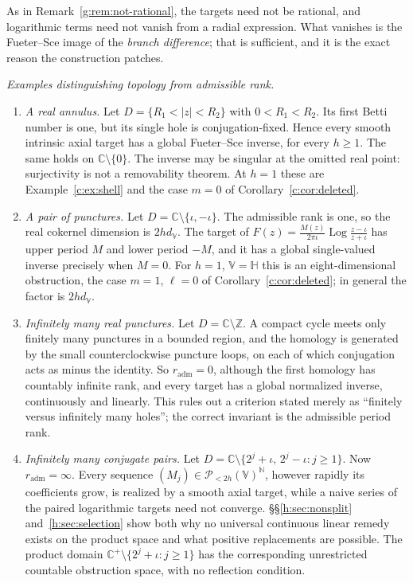 \documentclass[11pt,a4paper]{article}
\numberwithin{equation}{section}
\theoremstyle{definition}
\theoremstyle{remark}
\theoremstyle{plain}
\newcommand{\HH}{\mathbb H}
\newcommand{\CC}{\mathbb C}
\newcommand{\ZZ}{\mathbb Z}
\newcommand{\Cplus}{\CC^{+}}
\newcommand{\abs}[1]{\lvert #1\rvert}
\newcommand{\VV}{\mathbb V}                       %
\newcommand{\dV}{d_{\VV}}                         %
\newcommand{\PolH}{\mathscr P_{<2h}(\VV)}
\begin{document}
As in Remark~\ref{g:rem:not-rational}, the targets need not be rational, and
logarithmic terms need not vanish from a radial expression. What vanishes is
the Fueter--Sce image of the \emph{branch difference}; that is sufficient, and
it is the exact reason the construction patches.

\emph{Examples distinguishing topology from admissible rank.}
\begin{enumerate}[label=\textup{(\alph*)}]
\item \emph{A real annulus.} Let $D=\{R_1<\abs z<R_2\}$ with $0<R_1<R_2$. Its
first Betti number is one, but its single hole is conjugation-fixed. Hence
every smooth intrinsic axial target has a global Fueter--Sce inverse, for every
$h\ge1$. The same holds on $\CC\setminus\{0\}$. The inverse may be singular at
the omitted real point: surjectivity is not a removability theorem. At $h=1$
these are Example~\ref{c:ex:shell} and the case $m=0$ of
Corollary~\ref{c:cor:deleted}.
\item \emph{A pair of punctures.} Let $D=\CC\setminus\{\iota,-\iota\}$. The
admissible rank is one, so the real cokernel dimension is $2h\dV$. The target
of $F(z)=\frac{M(z)}{2\pi\iota}\operatorname{Log}\frac{z-\iota}{z+\iota}$ has
upper period $M$ and lower period $-M$, and it has a global single-valued
inverse precisely when $M=0$. For $h=1$, $\VV=\HH$ this is an
eight-dimensional obstruction, the case $m=1$, $\ell=0$ of
Corollary~\ref{c:cor:deleted}; in general the factor is $2h\dV$.
\item \emph{Infinitely many real punctures.} Let $D=\CC\setminus\ZZ$. A compact
cycle meets only finitely many punctures in a bounded region, and the homology
is generated by the small counterclockwise puncture loops, on each of which
conjugation acts as minus the identity. So $r_{\mathrm{adm}}=0$, although the
first homology has countably infinite rank, and every target has a global
normalized inverse, continuously and linearly. This rules out a criterion
stated merely as ``finitely versus infinitely many holes''; the correct
invariant is the admissible period rank.
\item \emph{Infinitely many conjugate pairs.} Let
$D=\CC\setminus\{2^j+\iota,\,2^j-\iota:j\ge1\}$. Now $r_{\mathrm{adm}}=\infty$.
Every sequence $(M_j)\in\PolH^{\mathbb N}$, however rapidly its coefficients
grow, is realized by a smooth axial target, while a naive series of the paired
logarithmic targets need not converge. \S\S\ref{h:sec:nonsplit}
and~\ref{h:sec:selection} show both why no universal continuous linear remedy
exists on the product space and what positive replacements are possible. The
product domain $\Cplus\setminus\{2^j+\iota:j\ge1\}$ has the corresponding
unrestricted countable obstruction space, with no reflection condition.
\end{enumerate}
\end{document}
